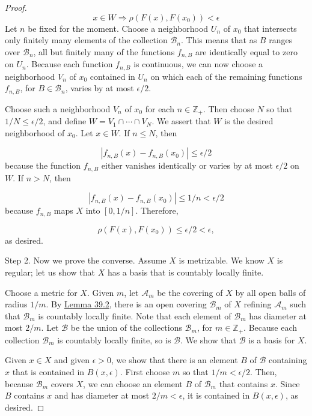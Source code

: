 \begin{proof}
\[
x \in W \Rightarrow \rho ({F(x),F(x_{0}) }) < \epsilon
\]
Let \(n\) be fixed for the moment. Choose a neighborhood \(U_{n}\) of \(x_{0}\) that intersects only finitely many elements of the collection \(\mathcal{B}_{n}\). This means that as \(B\) ranges over \(\mathcal{B}_{n}\), all but finitely many of the functions \(f_{n,B}\) are identically equal to zero on \(U_{n}\). Because each function \(f_{n,B}\) is continuous, we can now choose a neighborhood \(V_{n}\) of \(x_{0}\) contained in \(U_{n}\) on which each of the remaining functions \(f_{n,B}\), for \(B \in {\mathcal{B}}_{n}\), varies by at most \(\epsilon /2\).

Choose such a neighborhood \(V_{n}\) of \(x_{0}\) for each \(n \in {\mathbb{Z}}_{ + }\). Then choose \(N\) so that \(1/N \leq \epsilon /2\), and define \(W = V_{1} \cap \cdots \cap {V}_{N}\). We assert that \(W\) is the desired neighborhood of \(x_{0}\). Let \(x \in W\). If \(n \leq N\), then

\[
| {f_{n,B}(x) - f_{n,B}(x_{0}) }| \leq \epsilon /2
\]
because the function \(f_{n,B}\) either vanishes identically or varies by at most \(\epsilon /2\) on \(W\). If \(n > N\), then

\[
| {f_{n,B}(x) - f_{n,B}(x_{0}) }| \leq 1/n < \epsilon /2
\]
because \(f_{n,B}\) maps \(X\) into \([{0,1/n}]\). Therefore,

\[
\rho ({F(x),F(x_{0}) }) \leq \epsilon /2 < \epsilon ,
\]
as desired.

Step 2. Now we prove the converse. Assume \(X\) is metrizable. We know \(X\) is regular; let us show that \(X\) has a basis that is countably locally finite.

Choose a metric for \(X\). Given \(m\), let \(\mathcal{A}_{m}\) be the covering of \(X\) by all open balls of radius \(1/m\). By \hyperref[lem:39.2]{Lemma 39.2}, there is an open covering \(\mathcal{B}_{m}\) of \(X\) refining \(\mathcal{A}_{m}\) such that \(\mathcal{B}_{m}\) is countably locally finite. Note that each element of \(\mathcal{B}_{m}\) has diameter at most \(2/m\). Let \(\mathcal{B}\) be the union of the collections \(\mathcal{B}_{m}\), for \(m \in {\mathbb{Z}}_{ + }\). Because each collection \(\mathcal{B}_{m}\) is countably locally finite, so is \(\mathcal{B}\). We show that \(\mathcal{B}\) is a basis for \(X\).

Given \(x \in X\) and given \(\epsilon > 0\), we show that there is an element \(B\) of \(\mathcal{B}\) containing \(x\) that is contained in \(B({x,\epsilon })\). First choose \(m\) so that \(1/m < \epsilon /2\). Then, because \(\mathcal{B}_{m}\) covers \(X\), we can choose an element \(B\) of \(\mathcal{B}_{m}\) that contains \(x\). Since \(B\) contains \(x\) and has diameter at most \(2/m < \epsilon\), it is contained in \(B({x,\epsilon })\), as desired.
\end{proof}
